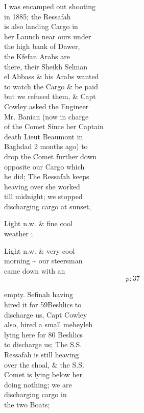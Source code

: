 \documentclass{report}
\begin{document}

	\par{
 	I was encamped out shooting\ \\in 1885; the Ressafah\ \\is also landing Cargo in\ \\her Launch near ours under\ \\the high bank of Dawer,\ \\the Kfefan Arabs are\ \\there, their Sheikh Selman\ \\el Abbass \& his Arabs wanted\ \\to watch the Cargo \& be paid\ \\but we refused them, \& Capt\ \\Cowley asked the Engineer\ \\Mr. Banian (now in charge\ \\of the Comet Since her Captain\ \\death Lieut Beaumont in\ \\Baghdad 2 months ago) to\ \\drop the Comet further down\ \\opposite our Cargo which\ \\he did; The Ressafah keeps\ \\heaving over she worked\ \\till midnight; we stopped\ \\discharging cargo at sunset,\ \\
	}

	\par{
 	Light n.w. \& fine cool\ \\weather ;\ \\
	}

	\par{
 	Light n.w. \& very cool\ \\morning \~{} our steersman\ \\came down with an\ \\
  \[p: 37 \]

	}


	\par{
 	empty. Sefinah having\ \\hired it for 59Beshlics to\ \\discharge us, Capt Cowley\ \\also, hired a small meheyleh\ \\lying here for 80 Beshlics\ \\to discharge us; The S.S.\ \\Ressafah is still heaving\ \\over the shoal, \& the S.S.\ \\Comet is lying below her\ \\doing nothing; we are\ \\discharging cargo in\ \\the two Boats;\ \\
	}
\end{document}
